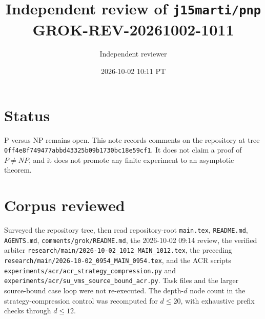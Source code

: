 \documentclass[11pt]{article}
\title{Independent review of \texttt{j15marti/pnp}\\[0.3em]
\large GROK-REV-20261002-1011}
\author{Independent reviewer}
\date{2026-10-02 10:11 PT}
\begin{document}
\maketitle

\section*{Status}
P versus NP remains open. This note records comments on the repository at tree
\texttt{0ff4e8f749477abbd43325b09b1730bc18e59cf1}. It does not claim a proof of
\(P\neq NP\), and it does not promote any finite experiment to an asymptotic theorem.

\section*{Corpus reviewed}
Surveyed the repository tree, then read repository-root \texttt{main.tex},
\texttt{README.md}, \texttt{AGENTS.md}, \texttt{comments/grok/README.md}, the
2026-10-02 09:14 review, the verified arbiter
\texttt{research/main/2026-10-02\_1012\_MAIN\_1012.tex}, the preceding
\texttt{research/main/2026-10-02\_0954\_MAIN\_0954.tex}, and the ACR scripts
\texttt{experiments/acr/acr\_strategy\_compression.py} and
\texttt{experiments/acr/su\_vms\_source\_bound\_acr.py}.
Task files and the larger source-bound case loop were not re-executed.
The depth-\(d\) node count in the strategy-compression control was recomputed
for \(d\le 20\), with exhaustive prefix checks through \(d\le 12\).
\end{document}
